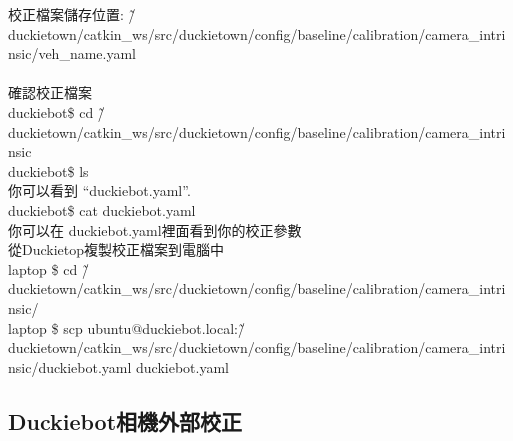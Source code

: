 \documentclass{article}
\begin{document}
校正檔案儲存位置: \~/duckietown/catkin\_ws/src/duckietown/config/baseline/calibration/camera\_intrinsic/veh\_name.yaml
\\
\\確認校正檔案
\\duckiebot\$ cd \~/duckietown/catkin\_ws/src/duckietown/config/baseline/calibration/camera\_intrinsic
\\duckiebot\$ ls
\\你可以看到 “duckiebot.yaml”.
\\duckiebot\$ cat duckiebot.yaml
\\你可以在 duckiebot.yaml裡面看到你的校正參數
\\從Duckietop複製校正檔案到電腦中
\\laptop \$ cd \~/duckietown/catkin\_ws/src/duckietown/config/baseline/calibration/camera\_intrinsic/
\\laptop \$ scp ubuntu@duckiebot.local:\~/duckietown/catkin\_ws/src/duckietown/config/baseline/calibration/camera\_intrinsic/duckiebot.yaml duckiebot.yaml

\subsection{Duckiebot相機外部校正}
\end{document}
